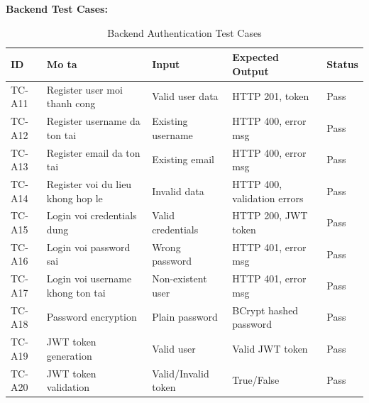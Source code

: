 \textbf{Backend Test Cases:}
\begin{table}[H]
\centering
\small
\begin{tabular}{|p{1cm}|p{3.5cm}|p{3cm}|p{3.5cm}|p{1.5cm}|}
\hline
\textbf{ID} & \textbf{Mo ta} & \textbf{Input} & \textbf{Expected Output} & \textbf{Status} \\
\hline
TC-A11 & Register user moi thanh cong & Valid user data & HTTP 201, token & Pass \\
\hline
TC-A12 & Register username da ton tai & Existing username & HTTP 400, error msg & Pass \\
\hline
TC-A13 & Register email da ton tai & Existing email & HTTP 400, error msg & Pass \\
\hline
TC-A14 & Register voi du lieu khong hop le & Invalid data & HTTP 400, validation errors & Pass \\
\hline
TC-A15 & Login voi credentials dung & Valid credentials & HTTP 200, JWT token & Pass \\
\hline
TC-A16 & Login voi password sai & Wrong password & HTTP 401, error msg & Pass \\
\hline
TC-A17 & Login voi username khong ton tai & Non-existent user & HTTP 401, error msg & Pass \\
\hline
TC-A18 & Password encryption & Plain password & BCrypt hashed password & Pass \\
\hline
TC-A19 & JWT token generation & Valid user & Valid JWT token & Pass \\
\hline
TC-A20 & JWT token validation & Valid/Invalid token & True/False & Pass \\
\hline
\end{tabular}
\caption{Backend Authentication Test Cases}
\end{table}

